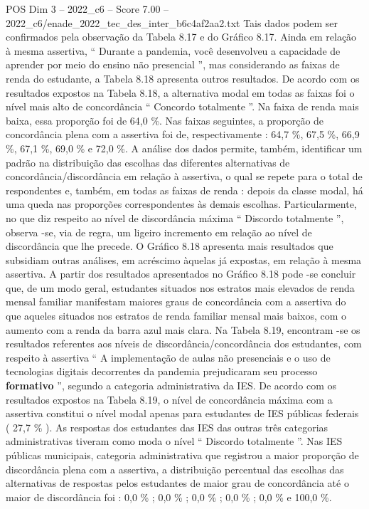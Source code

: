 \begin{textsample}{POS Dim 3 – 2022\_c6 – Score 7.00 – 2022\_c6/enade\_2022\_tec\_des\_inter\_b6c4af2aa2.txt}
Tais dados podem ser confirmados pela observação da Tabela 8.17 e do Gráfico 8.17.
Ainda em relação à mesma assertiva, “ Durante a pandemia, você desenvolveu a capacidade de aprender por meio do ensino não presencial ”, mas considerando as faixas de renda do estudante, a Tabela 8.18 apresenta outros resultados.
De acordo com os resultados expostos na Tabela 8.18, a alternativa modal em todas as faixas foi o nível mais alto de concordância “ Concordo totalmente ”.
Na faixa de renda mais baixa, essa proporção foi de 64,0 \%.
Nas faixas seguintes, a proporção de concordância plena com a assertiva foi de, respectivamente : 64,7 \%, 67,5 \%, 66,9 \%, 67,1 \%, 69,0 \% e 72,0 \%.
A análise dos dados permite, também, identificar um padrão na distribuição das escolhas das diferentes alternativas de concordância/discordância em relação à assertiva, o qual se repete para o total de respondentes e, também, em todas as faixas de renda : depois da classe modal, há uma queda nas proporções correspondentes às demais escolhas.
Particularmente, no que diz respeito ao nível de discordância máxima “ Discordo totalmente ”, observa -se, via de regra, um ligeiro incremento em relação ao nível de discordância que lhe precede.
O Gráfico 8.18 apresenta mais resultados que subsidiam outras análises, em acréscimo àquelas já expostas, em relação à mesma assertiva.
A partir dos resultados apresentados no Gráfico 8.18 pode -se concluir que, de um modo geral, estudantes situados nos estratos mais elevados de renda mensal familiar manifestam maiores graus de concordância com a assertiva do que aqueles situados nos estratos de renda familiar mensal mais baixos, com o aumento com a renda da barra azul mais clara.
Na Tabela 8.19, encontram -se os resultados referentes aos níveis de discordância/concordância dos estudantes, com respeito à assertiva “ A implementação de aulas não presenciais e o uso de tecnologias digitais decorrentes da pandemia prejudicaram seu processo \textbf{formativo} ”, segundo a categoria administrativa da IES.
De acordo com os resultados expostos na Tabela 8.19, o nível de concordância máxima com a assertiva constitui o nível modal apenas para estudantes de IES públicas federais ( 27,7 \% ).
As respostas dos estudantes das IES das outras três categorias administrativas tiveram como moda o nível “ Discordo totalmente ”.
Nas IES públicas municipais, categoria administrativa que registrou a maior proporção de discordância plena com a assertiva, a distribuição percentual das escolhas das alternativas de respostas pelos estudantes de maior grau de concordância até o maior de discordância foi : 0,0 \% ; 0,0 \% ; 0,0 \% ; 0,0 \% ; 0,0 \% e 100,0 \%.

\end{textsample}
